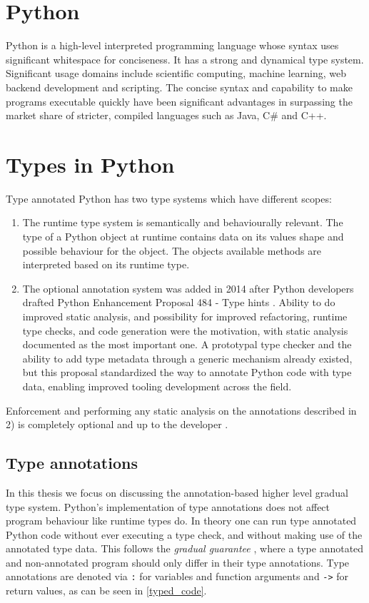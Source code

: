 
\section{Python}
Python is a high-level interpreted programming language whose syntax uses significant whitespace for conciseness. It has a strong and dynamical type system. Significant usage domains include scientific computing, machine learning, web backend development and scripting. The concise syntax and capability to make programs executable quickly have been significant advantages in surpassing the market share of stricter, compiled languages such as Java, C\# and C++.


\section{Types in Python}

Type annotated Python has two type systems which have different scopes:
\begin{enumerate}
    \item The runtime type system is semantically and behaviourally relevant. The type of a Python object at runtime contains data on its values shape and possible behaviour for the object. The objects available methods are interpreted based on its runtime type.
    \item The optional annotation system was added in 2014 after Python developers drafted Python Enhancement Proposal 484 - Type hints \cite{pep_484}. Ability to do improved static analysis, and possibility for improved refactoring, runtime type checks, and code generation were the motivation, with static analysis documented as the most important one. A prototypal type checker and the ability to add type metadata through a generic mechanism already existed, but this proposal standardized the way to annotate Python code with type data, enabling improved tooling development across the field.
\end{enumerate}

Enforcement and performing any static analysis on the annotations described in 2) is completely optional and up to the developer \cite{python_typing}.

\subsection{Type annotations}
In this thesis we focus on discussing the annotation-based higher level gradual type system. Python's implementation of type annotations does not affect program behaviour like runtime types do. In theory one can run type annotated Python code without ever executing a type check, and without making use of the annotated type data. This follows the \emph{gradual guarantee} \cite{siek_refined_gradual_2015}, where a type annotated and non-annotated program should only differ in their type annotations. Type annotations are denoted via {\tt :} for variables and function arguments and {\tt ->} for return values, as can be seen in \ref{typed_code}.


